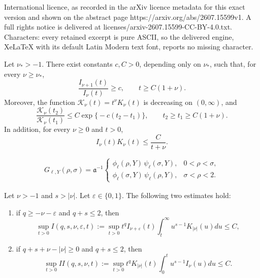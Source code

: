 \documentclass[10pt,a4paper]{amsart}
\begin{document}
International licence, as recorded in the arXiv licence metadata for this exact version and shown on the abstract page https://arxiv.org/abs/2607.15599v1. A full rights notice is delivered at licenses/arxiv-2607.15599-CC-BY-4.0.txt. Characters: every retained excerpt is pure ASCII, so the delivered engine, XeLaTeX with its default Latin Modern text font, reports no missing character.
\begin{lemma}\label{lem_bessel_inputs_high_frequency}
Let $\nu_*>-1$. There exist constants $c,C>0$, depending only on $\nu_*$, such that, for every $\nu\geq\nu_*$,
\begin{equation}\label{eq_S_lower_large}
    \frac{I_{\nu+1}(t)}{I_\nu(t)}
    \geq c,
    \qquad
    t\geq C(1+\nu).
\end{equation}
Moreover, the function $\mathcal K_\nu(t)=t^\nu K_\nu(t)$ is decreasing on $(0,\infty)$, and
\begin{equation}\label{eq_K_normalized_exp_decay}
    \frac{\mathcal K_\nu(t_2)}{\mathcal K_\nu(t_1)}
    \leq
    C\exp\bigl\{-c(t_2-t_1)\bigr\},
    \qquad
    t_2\geq t_1\geq C(1+\nu).
\end{equation}
In addition, for every $\nu\geq 0$ and $t>0$,
\begin{equation}\label{eq:product:Bessel}
    I_\nu(t)K_\nu(t)
    \leq
    \frac{C}{t+\nu}.
\end{equation}
\end{lemma}

\begin{align}\label{eq_kernel_Green}
    G_{\ell,Y}(\rho,\sigma) = \mathfrak a^{-1}
    \begin{cases}
        \phi_{\ell}(\rho,Y) \, \psi_{\ell}(\sigma,Y), & 0 < \rho < \sigma,\\[4pt]
        \phi_{\ell}(\sigma,Y) \, \psi_{\ell}(\rho,Y), & \sigma < \rho < 2.
    \end{cases}
\end{align}

\begin{lemma}\label{lem:Bessel:integral}
Let $\nu>-1$ and $s>|\nu|$. Let $\varepsilon \in \{0,1\}$. The following two estimates hold:
\begin{enumerate}[label=(\roman*)]
    \item if $q\ge -\nu - \varepsilon$ and $q+s\le 2$, then
    \begin{equation*}
        \sup_{t>0}I(q,s,\nu,\varepsilon,t):=\sup_{t>0} t^q I_{\nu+\varepsilon}(t) \int_t^\infty u^{s-1} K_{|\nu|}(u) du \le C,
    \end{equation*}
    \item if $q+s+\nu-|\nu|\ge 0$ and $q+s\le 2$, then
    \begin{equation*}
        \sup_{t>0}II(q,s,\nu,t):= \sup_{t>0} t^q K_{|\nu|}(t) \int_0^t u^{s-1} I_{\nu}(u) du \le C.
    \end{equation*}
\end{enumerate}
\end{lemma}
\end{document}
